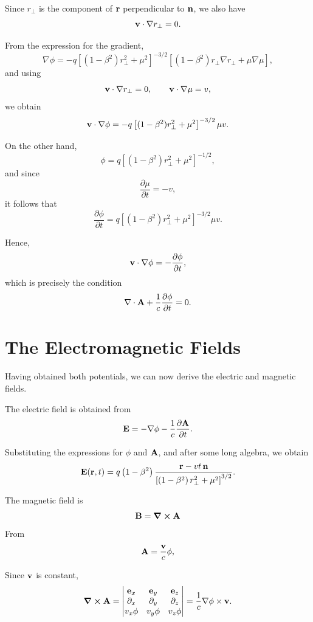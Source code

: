 \documentclass[12pt]{article}
\begin{document}
Since $r_\perp$ is the component of $\vb r$ perpendicular to $\vb n$, we also have
\begin{equation}
  \vb v\cdot\nabla r_\perp
  =
  0.
\end{equation}

From the expression for the gradient,
\[
\nabla\phi
=
-
q
\left[
(1-\beta^2)r_\perp^2+\mu^2
\right]^{-3/2}
\left[
(1-\beta^2)r_\perp\nabla r_\perp
+
\mu\nabla\mu
\right],
\]
and using
\[
\vb v\cdot\nabla r_\perp=0,
\qquad
\vb v\cdot\nabla\mu=v,
\]
we obtain
\[
\vb v\cdot\nabla\phi
=
-
q
\left[
(1-\beta^2)r_\perp^2+\mu^2
\right]^{-3/2}
\mu v.
\]

On the other hand,
\[
\phi
=
q
\left[
(1-\beta^2)r_\perp^2+\mu^2
\right]^{-1/2},
\]
and since
\[
\frac{\partial\mu}{\partial t}
=
-v,
\]
it follows that
\[
\frac{\partial\phi}{\partial t}
=
q
\left[
(1-\beta^2)r_\perp^2+\mu^2
\right]^{-3/2}
\mu v.
\]

Hence,
\[
\vb v\cdot\nabla\phi
=
-
\frac{\partial\phi}{\partial t},
\]
which is precisely the condition
\[
\nabla\cdot\vb A
+
\frac1c
\frac{\partial\phi}{\partial t}
=
0.
\]

\section{The Electromagnetic Fields}
 Having obtained both potentials, we can now derive the electric and magnetic
fields.

The electric field is obtained from
\[
  \vb E
  =
  -\nabla\phi
  -
  \frac{1}{c}
  \frac{\partial\vb A}{\partial t}.
\]

Substituting the expressions for $\phi$ and $\vb A$, and after some long algebra,
we obtain
\begin{equation}
  \vb E(\vb r,t)
  =
  q\left(1-\beta^2\right)
  \frac{
    \vb r-vt\,\vb n
  }{
    \left[
      \left(1-\beta^2\right)r_\perp^2+\mu^2
    \right]^{3/2}
  }.
  \label{eq:electric_field_uniform_motion}
\end{equation}

The magnetic field is
\[
  {\vb B} = \curl{\vb A}
\]
 From
\[
  \vb A=\frac{\vb v}{c}\phi,
\]

Since $\vb v$ is constant,
\[
\curl\vb A
=
\begin{vmatrix}
\vb e_x & \vb e_y & \vb e_z \\
\partial_x & \partial_y & \partial_z \\
v_x\phi & v_y\phi & v_z\phi
\end{vmatrix}
=
  \frac{1}{c}\nabla\phi\times\vb v.
\]
\end{document}
